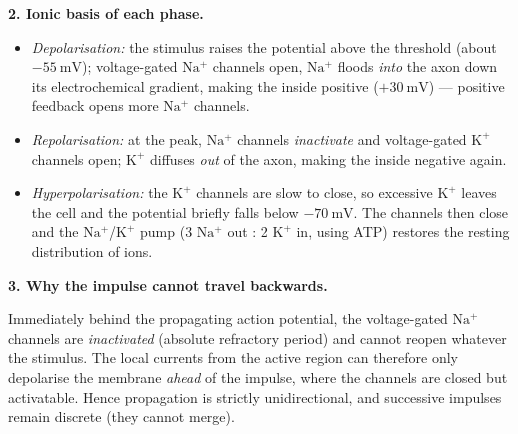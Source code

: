 \documentclass[11pt]{article}
\newcommand{\cle}[1]{{\popxbold\color{popdark}#1}}
\begin{document}
\begin{corrige}
\textbf{2. Ionic basis of each phase.}
\begin{itemize}
\item \emph{Depolarisation:} the stimulus raises the potential above the threshold (about $-55\ \mathrm{mV}$); \cle{voltage-gated $\mathrm{Na^+}$ channels} open, $\mathrm{Na^+}$ floods \emph{into} the axon down its electrochemical gradient, making the inside positive ($+30\ \mathrm{mV}$) — positive feedback opens more $\mathrm{Na^+}$ channels.
\item \emph{Repolarisation:} at the peak, $\mathrm{Na^+}$ channels \emph{inactivate} and \cle{voltage-gated $\mathrm{K^+}$ channels} open; $\mathrm{K^+}$ diffuses \emph{out} of the axon, making the inside negative again.
\item \emph{Hyperpolarisation:} the $\mathrm{K^+}$ channels are slow to close, so excessive $\mathrm{K^+}$ leaves the cell and the potential briefly falls below $-70\ \mathrm{mV}$. The channels then close and the $\mathrm{Na^+}$/$\mathrm{K^+}$ pump (3 $\mathrm{Na^+}$ out : 2 $\mathrm{K^+}$ in, using ATP) restores the resting distribution of ions.
\end{itemize}

\textbf{3. Why the impulse cannot travel backwards.}\par
Immediately behind the propagating action potential, the voltage-gated $\mathrm{Na^+}$ channels are \emph{inactivated} (absolute refractory period) and cannot reopen whatever the stimulus. The local currents from the active region can therefore only depolarise the membrane \emph{ahead} of the impulse, where the channels are closed but activatable. Hence propagation is strictly unidirectional, and successive impulses remain discrete (they cannot merge).
\end{corrige}
\end{document}

